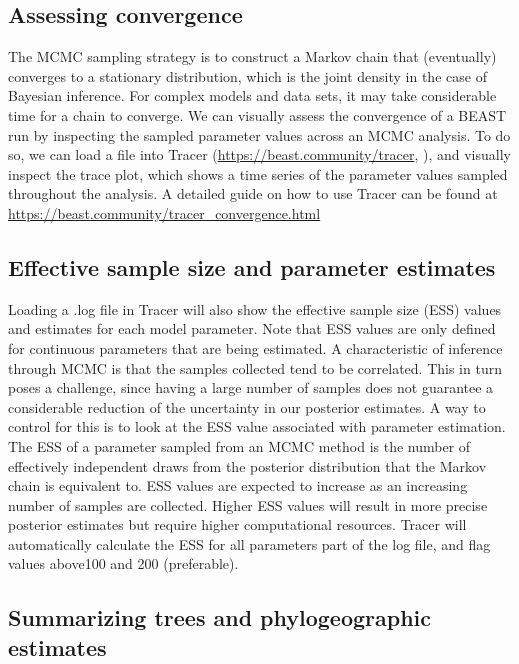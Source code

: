 \documentclass{article}
\newcommand{\code}[1]{
{\upshape\ttfamily{#1}}}
\begin{document}
\subsection*{Assessing convergence}

The MCMC sampling strategy is to construct a Markov chain that (eventually) converges to a stationary distribution, which is the joint density in the case of Bayesian inference.
For complex models and data sets, it may take considerable time for a chain to converge. We can visually assess the convergence of a BEAST run by inspecting the sampled parameter values across an MCMC analysis.
To do so, we can load a\code{.log} file into Tracer (\url{https://beast.community/tracer}, \cite{tracer}), %
 and visually inspect the trace plot, which shows a time series of the parameter values sampled throughout the analysis.
A detailed guide on how to use Tracer can be found at \url{https://beast.community/tracer_convergence.html}

\subsection*{Effective sample size and parameter estimates}

Loading a .log file in Tracer will also show the effective sample size (ESS) values and estimates for each model parameter.
Note that ESS values are only defined for continuous parameters that are being estimated.
A characteristic of inference through MCMC is that the samples collected tend to be correlated.
This in turn poses a challenge, since having a large number of samples does not guarantee a considerable reduction of the uncertainty in our posterior estimates.
A way to control for this is to look at the ESS value associated with parameter estimation.
The ESS of a parameter sampled from an MCMC method is the number of effectively independent draws from the posterior distribution that the Markov chain is equivalent to.
ESS values are expected to increase as an increasing number of samples are collected.
Higher ESS values will result in more precise posterior estimates but require higher computational resources.
Tracer will automatically calculate the ESS for all parameters part of the log file, and flag values above100 and 200 (preferable).

\subsection*{Summarizing trees and phylogeographic estimates}
\end{document}
